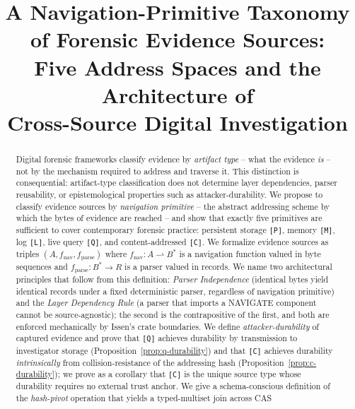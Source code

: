 \documentclass[conference]{IEEEtran}
\theoremstyle{definition}
\newcommand{\src}[1]{\texttt{[#1]}}
\begin{document}
\title{A Navigation-Primitive Taxonomy of Forensic Evidence Sources:\\
Five Address Spaces and the Architecture of\\
Cross-Source Digital Investigation}

\author{
}

\maketitle

\begin{abstract}
Digital forensic frameworks classify evidence by \emph{artifact type} -- what
the evidence \emph{is} -- not by the mechanism required to address and
traverse it. This distinction is consequential: artifact-type classification
does not determine layer dependencies, parser reusability, or
epistemological properties such as attacker-durability. We propose to
classify evidence sources by \emph{navigation primitive} -- the abstract
addressing scheme by which the bytes of evidence are reached -- and show
that exactly five primitives are sufficient to cover contemporary forensic
practice: persistent storage \src{P}, memory \src{M}, log \src{L}, live
query \src{Q}, and content-addressed \src{C}. We formalize evidence sources
as triples $(A, f_{\text{nav}}, f_{\text{parse}})$ where $f_{\text{nav}}: A
\rightharpoonup B^{*}$ is a navigation function valued in byte sequences and
$f_{\text{parse}}: B^{*} \to R$ is a parser valued in records. We name two
architectural principles that follow from this definition: \emph{Parser
Independence} (identical bytes yield identical records under a fixed
deterministic parser, regardless of navigation primitive) and the
\emph{Layer Dependency Rule} (a parser that imports a NAVIGATE component
cannot be source-agnostic); the second is the contrapositive of the first,
and both are enforced mechanically by Issen's crate boundaries. We define \emph{attacker-durability} of captured evidence and
prove that \src{Q} achieves durability by transmission to investigator
storage (Proposition~\ref{prop:q-durability}) and that \src{C} achieves
durability \emph{intrinsically} from collision-resistance of the addressing
hash (Proposition~\ref{prop:c-durability}); we prove as a corollary that
\src{C} is the unique source type whose durability requires no external
trust anchor. We give a schema-conscious definition of the
\emph{hash-pivot} operation that yields a typed-multiset join across CAS

\end{abstract}
\end{document}
